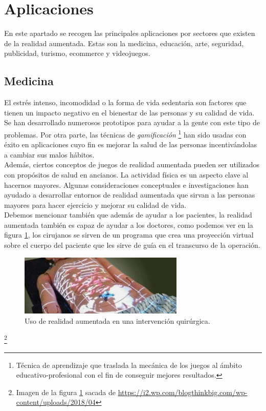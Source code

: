 \newpage
\section{Aplicaciones}
En este apartado se recogen las principales aplicaciones por sectores que existen de la realidad aumentada. Estas son la medicina, educación, arte, seguridad, publicidad, turismo, ecommerce y videojuegos.\\
\subsection{Medicina}
El estrés intenso, incomodidad o la forma de vida sedentaria son factores que tienen un impacto negativo en el bienestar de las personas y su calidad de vida. Se han desarrollado numerosos prototipos para ayudar a la gente con este tipo de problemas. Por otra parte, las técnicas de \textit{gamificación} \footnote{ Técnica de aprendizaje que traslada la mecánica de los juegos al ámbito educativo-profesional con el fin de conseguir mejores resultados.} han sido usadas con éxito en aplicaciones cuyo fin es mejorar la salud de las personas incentivándolas a cambiar sus malos hábitos.\\

Además, ciertos conceptos de juegos de realidad aumentada pueden ser utilizados con propósitos de salud en ancianos. La actividad física es un aspecto clave al hacernos mayores. Algunas consideraciones conceptuales e investigaciones han ayudado a desarrollar entornos de realidad aumentada que sirvan a las personas mayores para hacer ejercicio y mejorar su calidad de vida.\\

Debemos mencionar también que además de ayudar a los pacientes, la realidad aumentada también es capaz de ayudar a los doctores, como podemos ver en la figura \ref{fig:Surgeon}, los cirujanos se sirven de un programa que crea una proyección virtual sobre el cuerpo del paciente que les sirve de guía en el transcurso de la operación.

\begin{figure}[H]
     \centering
     \includegraphics[width=0.7\textwidth]{Images/medicina_AR.jpg}
     \caption{Uso de realidad aumentada en una intervención quirúrgica.}
     \label{fig:Surgeon}
 \end{figure}
 {\let\thefootnote\relax\footnote{{Imagen de la figura \ref{fig:Surgeon} sacada de \url{https://i2.wp.com/blogthinkbig.com/wp-content/uploads/2018/04}}}}

